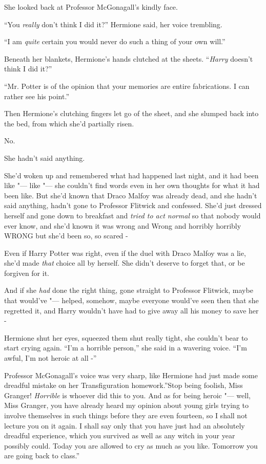 She looked back at Professor McGonagall's kindly face.

``You \emph{really} don't think I did it?'' Hermione said, her voice
trembling.

``I am \emph{quite} certain you would never do such a thing of your own
will.''

Beneath her blankets, Hermione's hands clutched at the sheets.
``\emph{Harry} doesn't think I did it?''

``Mr. Potter is of the opinion that your memories are entire
fabrications. I can rather see his point.''

Then Hermione's clutching fingers let go of the sheet, and she slumped
back into the bed, from which she'd partially risen.

No.

She hadn't said anything.

She'd woken up and remembered what had happened last night, and it had
been like "--- like "--- she couldn't find words even in her own thoughts for
what it had been like. But she'd known that Draco Malfoy was already
dead, and she hadn't said anything, hadn't gone to Professor Flitwick
and confessed. She'd just dressed herself and gone down to breakfast and
\emph{tried to act normal} so that nobody would ever know, and she'd
known it was wrong and Wrong and horribly horribly WRONG but she'd been
so, so scared -

Even if Harry Potter was right, even if the duel with Draco Malfoy was a
lie, she'd made \emph{that} choice all by herself. She didn't deserve to
forget that, or be forgiven for it.

And if she \emph{had} done the right thing, gone straight to Professor
Flitwick, maybe that would've "--- helped, somehow, maybe everyone would've
seen then that she regretted it, and Harry wouldn't have had to give
away all his money to save her -

Hermione shut her eyes, squeezed them shut really tight, she couldn't
bear to start crying again. ``I'm a horrible person,'' she said in a
wavering voice. ``I'm awful, I'm not heroic at all -''

Professor McGonagall's voice was very sharp, like Hermione had just made
some dreadful mistake on her Transfiguration homework.''Stop being
foolish, Miss Granger! \emph{Horrible} is whoever did this to you. And
as for being heroic "--- well, Miss Granger, you have already heard my
opinion about young girls trying to involve themselves in such things
before they are even fourteen, so I shall not lecture you on it again. I
shall say only that you have just had an absolutely dreadful experience,
which you survived as well as any witch in your year possibly could.
Today you are allowed to cry as much as you like. Tomorrow you are going
back to class.''

